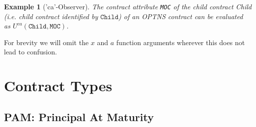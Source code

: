 \documentclass[9pt,oneside]{amsart}
\newtheorem{example}{Example}
\newcommand{\attr}[1]{\texttt{#1}}
\newcommand{\cldca}[2]{U^{ca}(\texttt{#1},#2)}
\begin{document}
\begin{multicols}{2}
\begin{example}['ca'-Observer] The contract attribute \attr{MOC} of the child contract \textit{Child} (i.e. child contract identified by $\texttt{Child}$) of an OPTNS contract can be evaluated as $\cldca{Child}{\attr{MOC}}$.
\end{example}

For brevity we will omit the $x$ and $a$ function arguments wherever this does not lead to confusion.




\end{multicols}
\newpage




\section{Contract Types}


\subsection{PAM: Principal At Maturity}\label{sec:pam}


\end{document}
